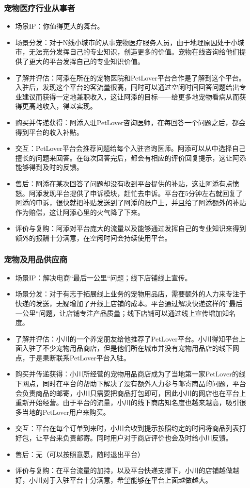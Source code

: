 \documentclass[a4paper]{ctexart}
\begin{document}
\subsubsection{宠物医疗行业从事者}
\begin{itemize}
  \item 场景IP：你值得更大的舞台。
  \item 场景分发：对于N线小城市的从事宠物医疗服务人员，由于地理原因处于小城市，无法充分发挥自己的专业知识，创造更多的价值。宠物在线咨询给他们提供了更大的平台发挥自己的专业知识价值。
  \item 了解并评估：阿添在所在的宠物医院和PetLover平台合作是了解到这个平台。入驻后，发现这个平台的客流量很高，同时可以通过空闲时间回答问题给出专业建议而获得一定地兼职收入，这让阿添的目标——给更多地宠物看病从而获得更高地收入，得以实现。
  \item 购买并传递获得：阿添入驻PetLover咨询医师，在每回答一个问题之后，都会得到平台的收入补贴。
  \item 交互：PetLover平台会推荐问题给每个入驻咨询医师。阿添可以从中选择自己擅长的问题来回答。在每次回答完后，都会有相应的评价回复提示，这让阿添能够得到及时的反馈。
  \item 售后：阿添在某次回答了问题却没有收到平台提供的补贴，这让阿添有点愤怒。阿添发现平台提供了申诉模块，赶忙去申诉。平台在5分钟左右就回复了阿添的申诉，很快就把补贴发送到了阿添的账户上，并且给了阿添额外的补贴作为赔偿，这让阿添心里的火气降了下来。
  \item 评价与复购：阿添对平台庞大的流量以及能够通过发挥自己的专业知识来得到额外的报酬十分满意，在空闲时间会持续使用平台。
\end{itemize}
\subsubsection{宠物及用品供应商}
\begin{itemize}
  \item 场景IP：解决电商“最后一公里“问题；线下店铺线上宣传。
  \item 场景分发：对于有志于拓展线上业务的宠物用品店，需要额外的人力来专注于快递的发送，无疑增加了开线上店铺的成本。平台通过解决快递这样的”最后一公里“问题，让店铺专注产品质量；线下店铺可以通过线上宣传增加知名度。
  \item 了解并评估：小川的一个养宠朋友给他推荐了PetLover平台。小川得知平台上面入驻了不少宠物用品商店，但是他们所在城市并没有宠物用品店的线下网点，于是果断联系PetLover平台入驻。
  \item 购买并传递获得：小川所经营的宠物用品商店成为了当地第一家PetLover的线下网点，同时在平台的帮助下解决了没有额外人力参与邮寄商品的问题，平台会负责商品的邮寄，小川只需要把商品打包即可，因此小川的网店也在平台上重新开始经营。由于平台的流量，小川的线下商店知名度也越来越高，吸引很多当地的PetLover用户来购买。
  \item 交互：平台在每个订单到来时，小川会收到提示按照约定的时间将商品列表打好包，让平台来负责邮寄。同时用户对于商店评价也会及时给小川反馈。
  \item 售后：无（可以按照意愿，随时退出平台）
  \item 评价与复购：在平台流量的加持，以及平台快递支撑下，小川的店铺越做越好，小川对于入驻平台十分满意，希望能够在平台上面越做越大。
\end{itemize}
\end{document}
